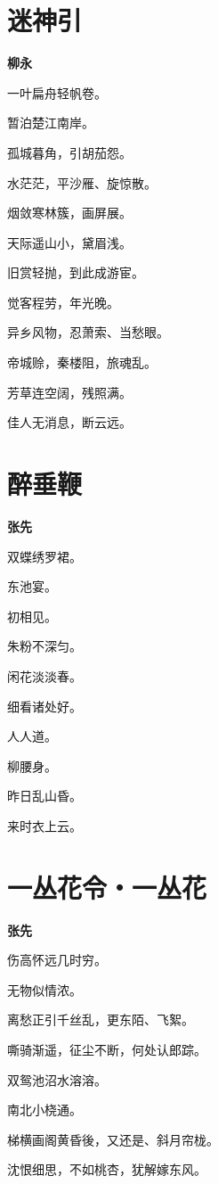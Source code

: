 \documentclass[12pt,a4paper]{ctexbook}
\begin{document}
\section{迷神引}
\textbf{柳永}\par\vspace{0.5em}
一叶扁舟轻帆卷。\par
暂泊楚江南岸。\par
孤城暮角，引胡茄怨。\par
水茫茫，平沙雁、旋惊散。\par
烟敛寒林簇，画屏展。\par
天际遥山小，黛眉浅。\par
旧赏轻抛，到此成游宦。\par
觉客程劳，年光晚。\par
异乡风物，忍萧索、当愁眼。\par
帝城赊，秦楼阻，旅魂乱。\par
芳草连空阔，残照满。\par
佳人无消息，断云远。\par

\section{醉垂鞭}
\textbf{张先}\par\vspace{0.5em}
双蝶绣罗裙。\par
东池宴。\par
初相见。\par
朱粉不深匀。\par
闲花淡淡春。\par
细看诸处好。\par
人人道。\par
柳腰身。\par
昨日乱山昏。\par
来时衣上云。\par

\section{一丛花令・一丛花}
\textbf{张先}\par\vspace{0.5em}
伤高怀远几时穷。\par
无物似情浓。\par
离愁正引千丝乱，更东陌、飞絮。\par
嘶骑渐遥，征尘不断，何处认郎踪。\par
双鸳池沼水溶溶。\par
南北小桡通。\par
梯横画阁黄昏後，又还是、斜月帘栊。\par
沈恨细思，不如桃杏，犹解嫁东风。\par
\end{document}
